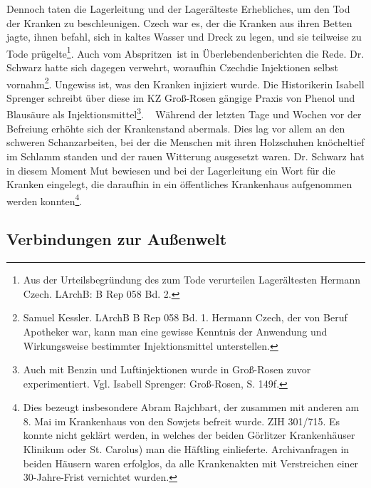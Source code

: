 Dennoch taten die Lagerleitung und der Lager\-älteste Erhebliches, um den Tod der Kranken zu beschleunigen. Czech war es, der die Kranken aus ihren Betten jagte, ihnen befahl, sich in kaltes Wasser und Dreck zu legen, und sie teilweise zu Tode prügelte\footnote{Aus der Urteilsbegründung des zum Tode verurteilen Lagerältesten Hermann Czech. LArchB: B Rep 058 Bd. 2.}. Auch vom \glqq Abspritzen\grqq~ist in Überlebendenberichten die Rede. Dr. Schwarz hatte sich dagegen verwehrt, woraufhin Czech\linebreak\newpage die Injektionen selbst vornahm\footnote{Samuel Kessler. LArchB B Rep 058 Bd. 1. Hermann Czech, der von Beruf Apotheker war, kann man eine gewisse Kenntnis der Anwendung und Wirkungsweise bestimmter Injektionsmittel unterstellen.}. Ungewiss ist, was den Kranken injiziert wurde. Die Historikerin Isabell Sprenger schreibt über diese im KZ Groß-Rosen gängige Praxis von Phenol und Blausäure als Injektionsmittel\footnote{Auch mit Benzin und Luftinjektionen wurde in Groß-Rosen zuvor experimentiert. Vgl. Isabell Sprenger: Groß-Rosen, S. 149f.}.
~\newline
\label{krankenhaus}
Während der letzten Tage und Wochen vor der Befreiung erhöhte sich der Krankenstand abermals. Dies lag vor allem an den schweren Schanzarbeiten, bei der die Menschen mit ihren Holzschuhen knöcheltief im Schlamm standen und der rauen Witterung ausgesetzt waren. Dr. Schwarz hat in diesem Moment Mut bewiesen und bei der Lagerleitung ein Wort für die Kranken eingelegt, die daraufhin in ein öffentliches Krankenhaus aufgenommen werden konnten\footnote{Dies bezeugt insbesondere Abram Rajchbart, der zusammen mit anderen am 8. Mai im Krankenhaus von den Sowjets befreit wurde. ZIH 301/715. Es konnte nicht geklärt werden, in welches der beiden Görlitzer Krankenhäuser Klinikum oder St. Carolus) man die Häftling einlieferte. Archivanfragen in beiden Häusern waren erfolglos, da alle Krankenakten mit Verstreichen einer 30-Jahre-Frist vernichtet wurden.}.

\subsection{Verbindungen zur Außenwelt}

